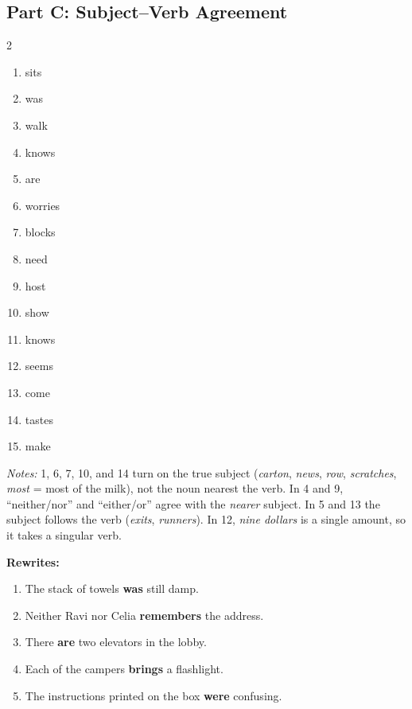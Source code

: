 \documentclass[11pt]{article}
\begin{document}
\subsection*{Part C: Subject--Verb Agreement}
\begin{multicols}{2}
\begin{enumerate}
  \item sits
  \item was
  \item walk
  \item knows
  \item are
  \item worries
  \item blocks
  \item need
  \item host
  \item show
  \item knows
  \item seems
  \item come
  \item tastes
  \item make
\end{enumerate}
\end{multicols}

\textit{Notes:} 1, 6, 7, 10, and 14 turn on the true subject (\emph{carton}, \emph{news}, \emph{row},
\emph{scratches}, \emph{most} = most of the milk), not the noun nearest the verb. In 4 and 9,
``neither/nor'' and ``either/or'' agree with the \emph{nearer} subject. In 5 and 13 the subject
follows the verb (\emph{exits}, \emph{runners}). In 12, \emph{nine dollars} is a single amount, so
it takes a singular verb.

\textbf{Rewrites:}
\begin{enumerate}[start=16]
  \item The stack of towels \textbf{was} still damp.
  \item Neither Ravi nor Celia \textbf{remembers} the address.
  \item There \textbf{are} two elevators in the lobby.
  \item Each of the campers \textbf{brings} a flashlight.
  \item The instructions printed on the box \textbf{were} confusing.
\end{enumerate}
\end{document}
